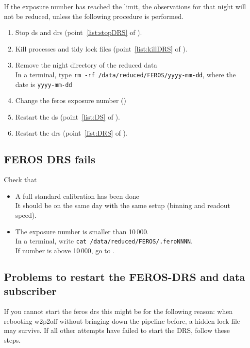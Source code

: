 \documentclass[11pt,fleqn,a4paper]{book}
\begin{document}
If the exposure number has reached the limit, the observations for that night will not be reduced, unless the following procedure is performed.

\label{proc:FEROSfix10000}
\begin{enumerate}
    \item Stop \gls{ds} and \gls{drs} (point~\ref{list:stopDRS} of ).
    \item Kill processes and tidy lock files (point~\ref{list:killDRS} of ).
    \item Remove the night directory of the reduced data\\
          In a terminal, type \texttt{rm -rf /data/reduced/FEROS/yyyy-mm-dd},
          where the date is \texttt{yyyy-mm-dd}
    \item Change the \gls{feros} exposure number ()
    \item Restart the \gls{ds} (point~\ref{list:DS} of ).
    \item Restart the \gls{drs} (point~\ref{list:DRS} of ).
\end{enumerate}


\subsection{FEROS DRS fails}

Check that
\begin{itemize}
    \item A full standard calibration has been done\\
          It should be on the same day with the same setup (binning and readout speed).
    \item The exposure number is smaller than 10\,000.\\
          In a terminal, write \texttt{cat /data/reduced/FEROS/.feroNNNN}.\\
          If number is above 10\,000, go to .
\end{itemize}

\subsection{Problems to restart the FEROS-DRS and data subscriber}


If you cannot start the \gls{feros} \gls{drs} this might be for the following reason: when rebooting \gls{w2p2off} without bringing down the pipeline before, a hidden lock file may survive. If all other attempts have failed to start the DRS, follow these steps.
\end{document}

